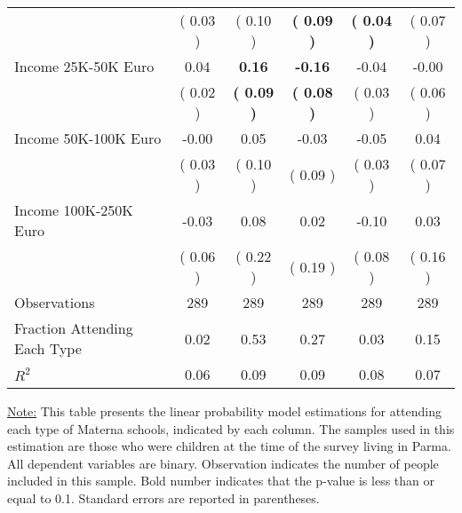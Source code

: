 \begin{table}[H]
{\begin{tabular}{lccccc}
\quad  & (     0.03 ) & (     0.10 )  & \textbf{(     0.09 )}  & \textbf{(     0.04 )} & (     0.07 ) \\
\quad Income 25K-50K Euro &      0.04 & \textbf{     0.16} & \textbf{    -0.16} &     -0.04 &     -0.00 \\
\quad  & (     0.02 ) & \textbf{(     0.09 )}  & \textbf{(     0.08 )}  & (     0.03 ) & (     0.06 ) \\
\quad Income 50K-100K Euro &     -0.00 &      0.05 &     -0.03 &     -0.05 &      0.04 \\
\quad  & (     0.03 ) & (     0.10 )  & (     0.09 )  & (     0.03 ) & (     0.07 ) \\
\quad Income 100K-250K Euro &     -0.03 &      0.08 &      0.02 &     -0.10 &      0.03 \\
\quad  & (     0.06 ) & (     0.22 )  & (     0.19 )  & (     0.08 ) & (     0.16 ) \\
\midrule
Observations & 289 & 289 & 289 & 289 & 289 \\
Fraction Attending Each Type &      0.02 &      0.53 &      0.27 &      0.03 &      0.15 \\
\midrule
$ R^2$ &      0.06 &      0.09 &      0.09 &      0.08 &      0.07 \\
\bottomrule
\end{tabular}}
\end{table}
\begin{scriptsize}
\noindent\underline{Note:} This table presents the linear probability model estimations for attending each type of Materna schools, indicated by each column. The samples used in this estimation are those who were children at the time of the survey living in Parma. All dependent variables are binary. Observation indicates the number of people included in this sample. Bold number indicates that the p-value is less than or equal to 0.1. Standard errors are reported in parentheses.
\end{scriptsize}
